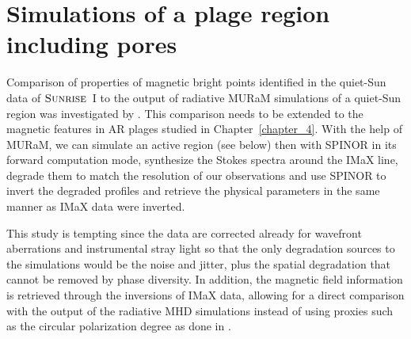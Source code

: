 \documentclass[goettingen, gauss, print]{thesis}
\begin{document}
\section{Simulations of a plage region including pores}
Comparison of properties of  magnetic bright points identified in the quiet-Sun data of $\textsc{Sunrise}$~I to the output of radiative MURaM simulations of a quiet-Sun region was investigated by \cite{riethmuller_comparison_2014}. This comparison needs to be extended to the magnetic features in AR plages studied in Chapter~\ref{chapter_4}. With the help of MURaM, we can simulate an active region (see below) then with SPINOR in its forward computation mode, synthesize the Stokes spectra around the IMaX line, degrade them to match the resolution of our observations and use SPINOR to invert the degraded profiles and retrieve the physical parameters in the same manner as IMaX data were inverted. 

This study is tempting since the data are corrected already for wavefront aberrations and instrumental stray light so that the only degradation sources to the simulations would be the noise and jitter, plus the spatial degradation that cannot be removed by phase diversity. In addition, the magnetic field information is retrieved through the inversions of IMaX data, allowing for a direct comparison with the output of the radiative MHD simulations instead of using proxies such as the circular polarization degree as done in \cite{riethmuller_comparison_2014}. 
\end{document}
